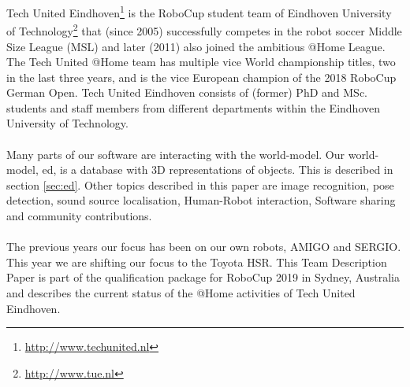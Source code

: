 Tech United Eindhoven\footnote{\url{http://www.techunited.nl}} is the RoboCup student team of Eindhoven University of Technology\footnote{\url{http://www.tue.nl}} that (since 2005) successfully competes in the robot soccer Middle Size League (MSL) and later (2011) also joined the ambitious @Home League. The Tech United @Home team has multiple vice World championship titles, two in the last three years, and is the vice European champion of the 2018 RoboCup German Open. %
Tech United Eindhoven consists of (former) PhD and MSc. students and staff members from different departments within the Eindhoven University of Technology.
\\\\
Many parts of our software are interacting with the world-model. Our world-model, \acrlong{ed}, is a database with 3D representations of objects. This is described in section \ref{sec:ed}. Other topics described in this paper are image recognition, pose detection, sound source localisation, Human-Robot interaction, Software sharing and community contributions.
\\\\
The previous years our focus has been on our own robots, AMIGO and SERGIO. This year we are shifting our focus to the Toyota HSR.
This Team Description Paper is part of the qualification package for RoboCup 2019 in Sydney, Australia and describes the current status of the @Home activities of Tech United Eindhoven.
